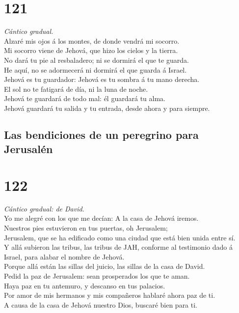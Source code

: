 \hypertarget{section-120}{%
\section{121}\label{section-120}}

 \emph{Cántico gradual.}\\
Alzaré mis ojos á los montes, de donde vendrá mi socorro.\\
 Mi socorro viene de Jehová, que hizo los cielos y la
tierra.\\
 No dará tu pie al resbaladero; ni se dormirá el que te
guarda.\\
 He aquí, no se adormecerá ni dormirá el que guarda á
Israel.\\
 Jehová es tu guardador: Jehová es tu sombra á tu mano
derecha.\\
 El sol no te fatigará de día, ni la luna de noche.\\
 Jehová te guardará de todo mal: él guardará tu alma.\\
 Jehová guardará tu salida y tu entrada, desde ahora y para
siempre.

\hypertarget{las-bendiciones-de-un-peregrino-para-jerusaluxe9n}{%
\subsection{Las bendiciones de un peregrino para
Jerusalén}\label{las-bendiciones-de-un-peregrino-para-jerusaluxe9n}}

\hypertarget{section-121}{%
\section{122}\label{section-121}}

 \emph{Cántico gradual: de David.}\\
Yo me alegré con los que me decían: A la casa de Jehová iremos.\\
 Nuestros pies estuvieron en tus puertas, oh Jerusalem;\\
 Jerusalem, que se ha edificado como una ciudad que está
bien unida entre sí.\\
 Y allá subieron las tribus, las tribus de JAH, conforme al
testimonio dado á Israel, para alabar el nombre de Jehová.\\
 Porque allá están las sillas del juicio, las sillas de la
casa de David.\\
 Pedid la paz de Jerusalem: sean prosperados los que te
aman.\\
 Haya paz en tu antemuro, y descanso en tus palacios.\\
 Por amor de mis hermanos y mis compañeros hablaré ahora paz
de ti.\\
 A causa de la casa de Jehová nuestro Dios, buscaré bien
para ti.

